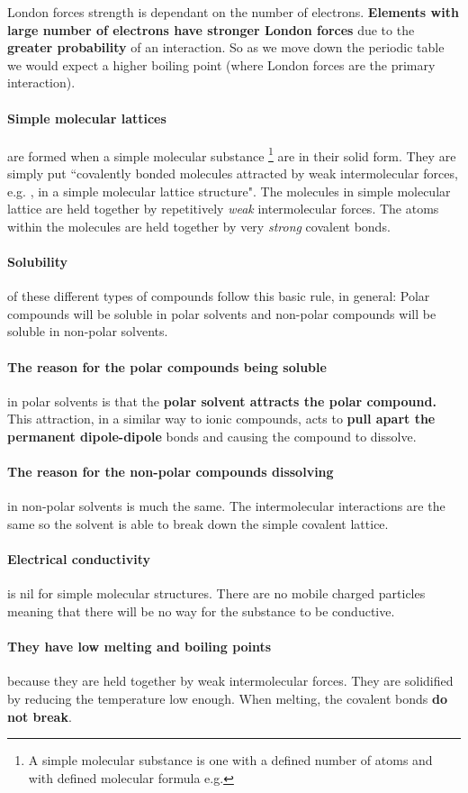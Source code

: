 	London forces strength is dependant on the number of electrons.
	\textbf{Elements with large number of electrons have stronger London forces} due to the \textbf{greater probability} of an interaction.
	So as we move down the periodic table we would expect a higher boiling point (where London forces are the primary interaction).
	
	\paragraph{Simple molecular lattices} are formed when a simple molecular substance
	\footnote{A simple molecular substance is one with a defined number of atoms and with defined molecular formula e.g. } are in their solid form.
	They are simply put ``covalently bonded molecules attracted by weak intermolecular forces, e.g. , in a simple molecular lattice structure".
	The molecules in simple molecular lattice are held together by repetitively \textit{weak} intermolecular forces. The atoms within the molecules are held together by very \textit{strong} covalent bonds.
	
	\paragraph{Solubility} of these different types of compounds follow this basic rule, in general: Polar compounds will be soluble in polar solvents and non-polar compounds will be soluble in non-polar solvents.
	
	\paragraph{The reason for the polar compounds being soluble} in polar solvents is that the \textbf{polar solvent attracts the polar compound.}
	This attraction, in a similar way to ionic compounds, acts to \textbf{pull apart the permanent dipole-dipole} bonds and causing the compound to dissolve.
	
	\paragraph{The reason for the non-polar compounds dissolving} in non-polar solvents is much the same.
	The intermolecular interactions are the same so the solvent is able to break down the simple covalent lattice.
	
	\paragraph{Electrical conductivity} is nil for simple molecular structures.
	There are no mobile charged particles meaning that there will be no way for the substance to be conductive.
    \paragraph{They have low melting and boiling points} because they are held together by weak intermolecular forces. They are solidified by reducing the temperature low enough. When melting, the covalent bonds \textbf{do not break}.